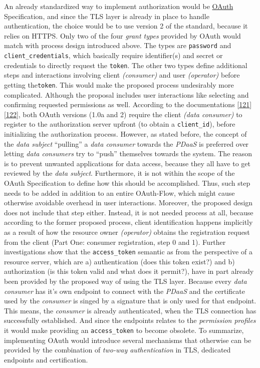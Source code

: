 \documentclass[12pt,english,a4paper,titlepage,cleardoublepage=empty,dottedtoc]{report}
\begin{document}
An already standardized way to implement authorization would be
\protect\hyperlink{link_oauth}{OAuth} Specification, and since the TLS
layer is already in place to handle authentication, the choice would be
to use version 2 of the standard, because it relies on HTTPS. Only two
of the four \emph{grant types} provided by OAuth would match with
process design introduced above. The types are \texttt{password} and
\texttt{client\_credentials}, which basically require identifier(s) and
secret or credentials to directly request the \texttt{token}. The other
two types define additional steps and interactions involving client
\emph{(consumer)} and user \emph{(operator)} before getting
the\texttt{token}. This would make the proposed process undesirably more
complicated. Although the proposal includes user interactions like
selecting and confirming requested permissions as well. According to the
documentations
{[}\protect\hyperlink{ref-web_spec_oauth-1a_client-reg}{121}{]}
{[}\protect\hyperlink{ref-web_spec_oauth-2_client-reg}{122}{]}, both
OAuth versions (1.0a and 2) require the client \emph{(data consumer)} to
register to the authorization server upfront (to obtain a
\texttt{client\_id}), before initializing the authorization process.
However, as stated before, the concept of the \emph{data subject}
``pulling'' a \emph{data consumer} towards the \emph{PDaaS} is preferred
over letting \emph{data consumers} try to ``push'' themselves towards
the system. The reason is to prevent unwanted applications for data
access, because they all have to get reviewed by the \emph{data
subject}. Furthermore, it is not within the scope of the OAuth
Specification to define how this should be accomplished. Thus, such step
needs to be added in addition to an entire OAuth-Flow, which might cause
otherwise avoidable overhead in user interactions. Moreover, the
proposed design does not include that step either. Instead, it is not
needed process at all, because according to the former proposed process,
client identification happens implicitly as a result of how the resource
owner \emph{(operator)} obtains the registration request from the client
(Part One: consumer registration, step 0 and 1). Further investigations
show that the \texttt{access\_token} semantic as from the perspective of
a resource server, which are a) authentication (does this token exist?)
and b) authorization (is this token valid and what does it permit?),
have in part already been provided by the proposed way of using the TLS
layer. Because every \emph{data consumer} has it's own endpoint to
connect with the \emph{PDaaS} and the certificate used by the
\emph{consumer} is singed by a signature that is only used for that
endpoint. This means, the \emph{consumer} is already authenticated, when
the TLS connection has successfully established. And since the endpoints
relates to the \emph{permission profiles} it would make providing an
\texttt{access\_token} to become obsolete. To summarize, implementing
OAuth would introduce several mechanisms that otherwise can be provided
by the combination of \emph{two-way authentication} in TLS, dedicated
endpoints and certification.
\end{document}
